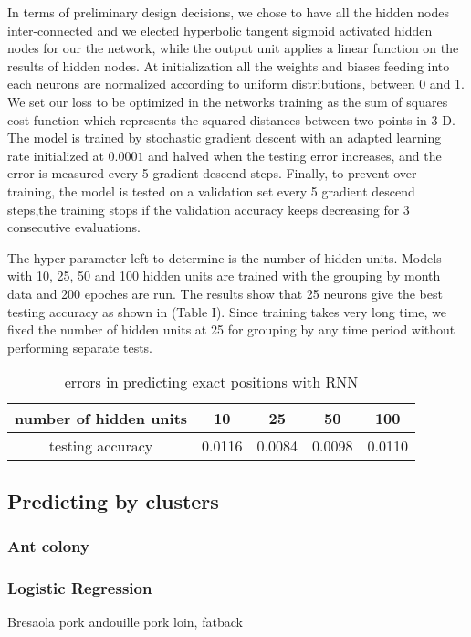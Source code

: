 \documentclass[10pt,conference]{IEEEtran}
\begin{document}
In terms of preliminary design decisions, we chose to have all the hidden nodes inter-connected and we elected hyperbolic tangent sigmoid activated hidden nodes for our the network, while the output unit applies a linear function on the results of hidden nodes.
At initialization all the weights and biases feeding into each neurons are normalized according to uniform distributions, between 0 and 1. 
We set our loss to be optimized in the networks training as the sum of squares cost function which represents the squared distances between two points in 3-D.
The model is trained by stochastic gradient descent with an adapted learning rate initialized at $0.0001$ and halved when the testing error increases, and the error is measured every 5 gradient descend steps. Finally, to prevent over-training, the model is tested on a validation set every 5 gradient descend steps,the training stops if the validation accuracy keeps decreasing for 3 consecutive evaluations.

The hyper-parameter left to determine is the number of hidden units. Models with 10, 25, 50 and 100 hidden units are trained with the grouping by month data and 200 epoches are run. The results show that 25 neurons give the best testing accuracy as shown in (Table I). Since training takes very long time, we fixed the number of hidden units at 25 for grouping by any time period without performing separate tests.
\begin{table}[h!]
\begin{center}
\begin{tabular}{ |c|c c c c| } 
 \hline
 number of hidden units & 10 & 25 & 50 & 100\\ 
 \hline
 testing accuracy & 0.0116 & 0.0084 & 0.0098 & 0.0110\\ 
 \hline
\end{tabular}
\end{center}
\caption{errors in predicting exact positions with RNN}
\label{table:1}
\end{table}
\subsection{Predicting by clusters}
\subsubsection{Ant colony}
\subsubsection{Logistic Regression}
    Bresaola pork andouille pork loin, fatback 
\end{document}
